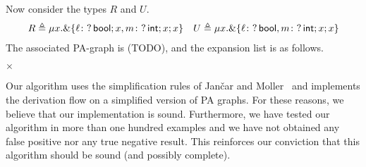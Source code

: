 Now consider the types $R$ and $U$.
%
\begin{align*}
  R \triangleq \mu x.\&\{\ell\colon ?\,\mathsf{bool};x, m\colon ?\,\mathsf{int};x;x\}
      &&
  U \triangleq \mu x.\&\{\ell\colon ?\,\mathsf{bool}, m\colon ?\,\mathsf{int};x;x\}
\end{align*}
%
The associated PA-graph is (TODO),
%
and the expansion list is as follows.
\par\noindent
{} 
\enspace  $\times$

Our algorithm uses the simplification rules of  Jan{\v{c}}ar and
Moller~\cite{janvcar1999techniques} and implements the derivation flow on
a simplified version of PA graphs. For these reasons, we
believe that our implementation is sound. Furthermore, we have tested
our algorithm in more than one hundred examples and we have not
obtained any false positive nor any true negative result. This
reinforces our conviction that this algorithm should be sound (and
possibly complete).

